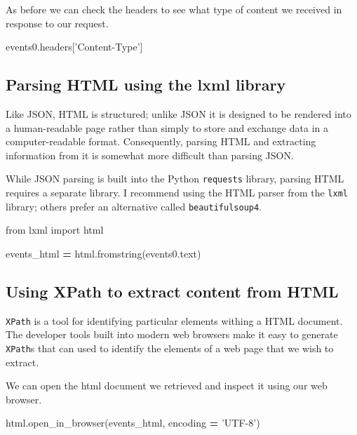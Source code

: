 \documentclass[]{book}
\newenvironment{Shaded}{\begin{snugshade}}{\end{snugshade}}
\newcommand{\StringTok}[1]{\textcolor[rgb]{0.31,0.60,0.02}{#1}}
\newcommand{\ImportTok}[1]{#1}
\newcommand{\OperatorTok}[1]{\textcolor[rgb]{0.81,0.36,0.00}{\textbf{#1}}}
\newcommand{\NormalTok}[1]{#1}
\begin{document}
As before we can check the headers to see what type of content we
received in response to our request.

\begin{Shaded}
\begin{Highlighting}[]
\NormalTok{events0.headers[}\StringTok{'Content-Type'}\NormalTok{]}
\end{Highlighting}
\end{Shaded}

\subsection{Parsing HTML using the lxml
library}\label{parsing-html-using-the-lxml-library}

Like JSON, HTML is structured; unlike JSON it is designed to be rendered
into a human-readable page rather than simply to store and exchange data
in a computer-readable format. Consequently, parsing HTML and extracting
information from it is somewhat more difficult than parsing JSON.

While JSON parsing is built into the Python \texttt{requests} library,
parsing HTML requires a separate library. I recommend using the HTML
parser from the \texttt{lxml} library; others prefer an alternative
called \texttt{beautifulsoup4}.

\begin{Shaded}
\begin{Highlighting}[]
\ImportTok{from}\NormalTok{ lxml }\ImportTok{import}\NormalTok{ html}

\NormalTok{events_html }\OperatorTok{=}\NormalTok{ html.fromstring(events0.text)}
\end{Highlighting}
\end{Shaded}

\subsection{Using XPath to extract content from
HTML}\label{using-xpath-to-extract-content-from-html}

\texttt{XPath} is a tool for identifying particular elements withing a
HTML document. The developer tools built into modern web browsers make
it easy to generate \texttt{XPath}s that can used to identify the
elements of a web page that we wish to extract.

We can open the html document we retrieved and inspect it using our web
browser.

\begin{Shaded}
\begin{Highlighting}[]
\NormalTok{html.open_in_browser(events_html, encoding }\OperatorTok{=} \StringTok{'UTF-8'}\NormalTok{)}
\end{Highlighting}
\end{Shaded}
\end{document}

